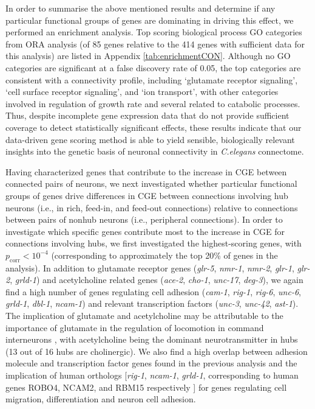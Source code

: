 {In order to summarise the above mentioned results and determine if any particular functional groups of genes are dominating in driving this effect, we performed an enrichment analysis.
Top scoring biological process GO categories from ORA analysis (of 85 genes relative to the 414 genes with sufficient data for this analysis) are listed in Appendix \ref{tab:enrichmentCON}.
Although no GO categories are significant at a false discovery rate of 0.05, the top categories are consistent with a connectivity profile, including `glutamate receptor signaling', `cell surface receptor signaling', and `ion transport', with other categories involved in regulation of growth rate and several related to catabolic processes.
Thus, despite incomplete gene expression data that do not provide sufficient coverage to detect statistically significant effects, these results indicate that our data-driven gene scoring method is able to yield sensible, biologically relevant insights into the genetic basis of neuronal connectivity in \textit{C.elegans} connectome.

Having characterized genes that contribute to the increase in CGE between connected pairs of neurons, we next investigated whether particular functional groups of genes drive differences in CGE between connections involving hub neurons (i.e., in rich, feed-in, and feed-out connections) relative to connections between pairs of nonhub neurons (i.e., peripheral connections).
In order to investigate which specific genes contribute most to the increase in CGE for connections involving hubs, we first investigated the highest-scoring genes, with $p_\mathrm{corr} < 10^{-4}$ (corresponding to approximately the top 20\% of genes in the analysis).
In addition to glutamate receptor genes (\emph{glr-5}, \emph{nmr-1}, \emph{nmr-2}, \emph{glr-1}, \mbox{\emph{glr-2}}, \emph{grld-1})
and acetylcholine related genes (\emph{ace-2}, \emph{cho-1}, \emph{unc-17}, \emph{deg-3}),
we again find a high number of genes regulating cell adhesion (\emph{cam-1}, \emph{rig-1}, \emph{rig-6}, \emph{unc-6}, \emph{grld-1}, \emph{dbl-1}, \mbox{\emph{ncam-1}})
and relevant transcription factors (\emph{unc-3}, \emph{unc-42}, \emph{ast-1}).
The implication of glutamate and acetylcholine may be attributable to the importance of glutamate in the regulation of locomotion in command interneurons \citep{Choi2015, Zheng1999}, with acetylcholine being the dominant neurotransmitter in hubs (13 out of 16 hubs are cholinergic).
We also find a high overlap between adhesion molecule and transcription factor genes found in the previous analysis and the implication of human orthologs [\emph{rig-1}, \emph{ncam-1}, \emph{grld-1}, corresponding to human genes ROBO4, NCAM2, and RBM15 respectively  \citep{Harris2010}] for genes regulating cell migration, differentiation and neuron cell adhesion.

}
